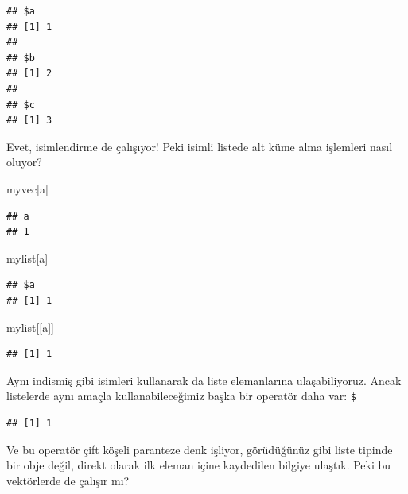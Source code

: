 \documentclass[
]{book}
\newenvironment{Shaded}{\begin{snugshade}}{\end{snugshade}}
\newcommand{\NormalTok}[1]{#1}
\newcommand{\OperatorTok}[1]{\textcolor[rgb]{0.81,0.36,0.00}{\textbf{#1}}}
\newcommand{\StringTok}[1]{\textcolor[rgb]{0.31,0.60,0.02}{#1}}
\begin{document}
\begin{verbatim}
## $a
## [1] 1
## 
## $b
## [1] 2
## 
## $c
## [1] 3
\end{verbatim}

Evet, isimlendirme de çalışıyor! Peki isimli listede alt küme alma işlemleri nasıl oluyor?

\begin{Shaded}
\begin{Highlighting}[]
\NormalTok{myvec[}\StringTok{\textquotesingle{}a\textquotesingle{}}\NormalTok{]}
\end{Highlighting}
\end{Shaded}

\begin{verbatim}
## a 
## 1
\end{verbatim}

\begin{Shaded}
\begin{Highlighting}[]
\NormalTok{mylist[}\StringTok{\textquotesingle{}a\textquotesingle{}}\NormalTok{]}
\end{Highlighting}
\end{Shaded}

\begin{verbatim}
## $a
## [1] 1
\end{verbatim}

\begin{Shaded}
\begin{Highlighting}[]
\NormalTok{mylist[[}\StringTok{\textquotesingle{}a\textquotesingle{}}\NormalTok{]]}
\end{Highlighting}
\end{Shaded}

\begin{verbatim}
## [1] 1
\end{verbatim}

Aynı indismiş gibi isimleri kullanarak da liste elemanlarına ulaşabiliyoruz. Ancak listelerde aynı amaçla kullanabileceğimiz başka bir operatör daha var: \texttt{\$}

\begin{Shaded}
\end{Shaded}

\begin{verbatim}
## [1] 1
\end{verbatim}

Ve bu operatör çift köşeli paranteze denk işliyor, görüdüğünüz gibi liste tipinde bir obje değil, direkt olarak ilk eleman içine kaydedilen bilgiye ulaştık. Peki bu vektörlerde de çalışır mı?
\end{document}
